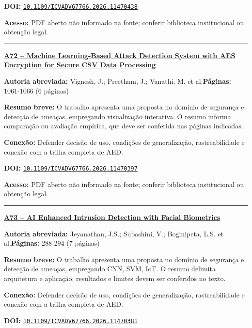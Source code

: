 \documentclass[10pt,a4paper]{article}
\begin{document}
\textbf{DOI:} \href{https://doi.org/10.1109/ICVADV67766.2026.11470438}{\nolinkurl{10.1109/ICVADV67766.2026.11470438}}\par
\textbf{Acesso:} PDF aberto não informado na fonte; conferir biblioteca institucional ou obtenção legal.\par
\noindent\rule{\textwidth}{0.35pt}
\par\medskip\noindent
{\large\bfseries\href{https://doi.org/10.1109/ICVADV67766.2026.11470397}{A72 -- Machine Learning-Based Attack Detection System with AES Encryption for Secure CSV Data Processing}}\par\smallskip
\textbf{Autoria abreviada:} Vignesh, J.; Preetham, J.; Vanathi, M. et al.\quad \textbf{Páginas:} 1061-1066 (6 páginas)\par
\textbf{Resumo breve:} O trabalho apresenta uma proposta no domínio de segurança e detecção de ameaças, empregando visualização interativa. O resumo informa comparação ou avaliação empírica, que deve ser conferida nas páginas indicadas.\par
\textbf{Conexão:} Defender decisão de uso, condições de generalização, rastreabilidade e conexão com a trilha completa de AED.\par
\textbf{DOI:} \href{https://doi.org/10.1109/ICVADV67766.2026.11470397}{\nolinkurl{10.1109/ICVADV67766.2026.11470397}}\par
\textbf{Acesso:} PDF aberto não informado na fonte; conferir biblioteca institucional ou obtenção legal.\par
\noindent\rule{\textwidth}{0.35pt}
\par\medskip\noindent
{\large\bfseries\href{https://doi.org/10.1109/ICVADV67766.2026.11470381}{A73 -- AI Enhanced Intrusion Detection with Facial Biometrics}}\par\smallskip
\textbf{Autoria abreviada:} Jeyanathan, J.S.; Subashini, V.; Boginipeta, L.S. et al.\quad \textbf{Páginas:} 288-294 (7 páginas)\par
\textbf{Resumo breve:} O trabalho apresenta uma proposta no domínio de segurança e detecção de ameaças, empregando CNN, SVM, IoT. O resumo delimita arquitetura e aplicação; resultados e limites devem ser conferidos no texto.\par
\textbf{Conexão:} Defender decisão de uso, condições de generalização, rastreabilidade e conexão com a trilha completa de AED.\par
\textbf{DOI:} \href{https://doi.org/10.1109/ICVADV67766.2026.11470381}{\nolinkurl{10.1109/ICVADV67766.2026.11470381}}\par
\end{document}
